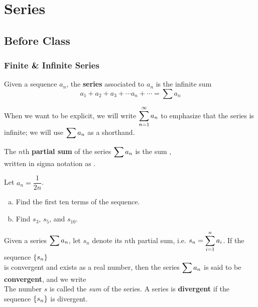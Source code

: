 \documentclass[notes]{subfiles}
\begin{document}
	\fancyhead[LO,RE]{\bfseries \small \currentname}
	\fancyfoot[C]{{}}
	\fancyfoot[RO,LE]{\large \thepage}	%
	
\section*{Series}\label{cs112}
	\subsection*{Before Class}
	\subsubsection*{Finite \& Infinite Series}
		\begin{defn}[Series]
			Given a sequence $a_n$, the \textbf{series} associated to $a_n$ is the infinite sum
				\[a_1 + a_2 + a_3 + \cdots a_n + \cdots = \sum a_n\]
		\end{defn}
		
		\begin{rmk}[Notation]
			When we want to be explicit, we will write $\displaystyle \sum_{n =1}^\infty a_n$ to emphasize that the series is infinite; we will use $\displaystyle \sum a_n$ as a shorthand.
		\end{rmk}
		
		\begin{defn}
			The $n$th \textbf{partial sum} of the series $\displaystyle \sum a_n$ is the sum ,\\[15pt] written in sigma notation as .
		\end{defn}
		
		\begin{ex}
			Let $a_n = \dfrac{1}{2n}$.  
			\begin{enumerate}[(a)]
				\item Find the first ten terms of the sequence.
					\newpage
					
				\item Find $s_3$, $s_5$, and $s_{10}$.  
			\end{enumerate}
		\end{ex}
		
		\begin{defn}
			Given a series $\displaystyle \sum a_n$, let $s_n$ denote its $n$th partial sum, i.e. $s_n = \displaystyle \sum_{i=1}^n a_i$.  If the sequence $\left\lbrace s_n \right\rbrace$\\[15pt] is convergent and  exists as a real number, then the series $\displaystyle \sum a_n$ is said to be \textbf{convergent}, and we write\\[10pt]
				\[\]
			The number $s$ is called the \emph{sum} of the series.  A series is \textbf{divergent} if the sequence $\left\lbrace s_n \right\rbrace$ is divergent.
		\end{defn}	
		
\end{document}
